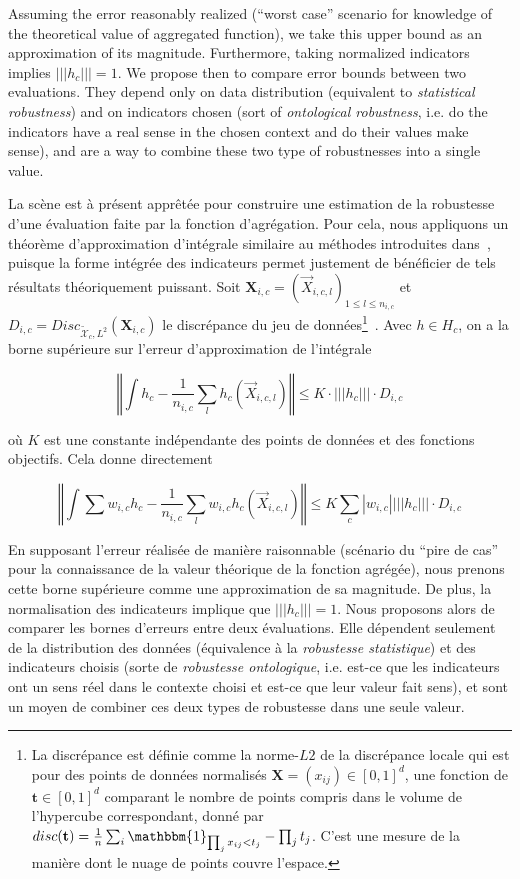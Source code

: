 {Assuming the error reasonably realized (``worst case'' scenario for knowledge of the theoretical value of aggregated function), we take this upper bound as an approximation of its magnitude. Furthermore, taking normalized indicators implies $\left|\left|\left|h_c\right|\right|\right| = 1$. We propose then to compare error bounds between two evaluations. They depend only on data distribution (equivalent to \emph{statistical robustness}) and on indicators chosen (sort of \emph{ontological robustness}, i.e. do the indicators have a real sense in the chosen context and do their values make sense), and are a way to combine these two type of robustnesses into a single value.
}{
La scène est à présent apprêtée pour construire une estimation de la robustesse d'une évaluation faite par la fonction d'agrégation. Pour cela, nous appliquons un théorème d'approximation d'intégrale similaire au méthodes introduites dans~\cite{varet2010developpement}, puisque la forme intégrée des indicateurs permet justement de bénéficier de tels résultats théoriquement puissant. Soit $\mathbf{X}_{i,c}=(\vec{X}_{i,c,l})_{1\leq l\leq n_{i,c}}$ et $D_{i,c}=Disc_{\tilde{\mathcal{X}}_{c},L^2}(\mathbf{X}_{i,c})$ le discrépance du jeu de données\footnote{La discrépance est définie comme la norme-$L2$ de la discrépance locale qui est pour des points de données normalisés $\mathbf{X}=(x_{ij})\in \left[0,1\right]^d$, une fonction de $\mathbf{t}\in \left[0,1\right]^d$ comparant le nombre de points compris dans le volume de l'hypercube correspondant, donné par $disc(\mathbf{t}) = \frac{1}{n}\sum_i \mathbbm{1}_{\prod_j x_{ij}<t_j} - \prod_j t_j$. C'est une mesure de la manière dont le nuage de points couvre l'espace.}~\cite{niederreiter1972discrepancy}. Avec $h\in H_{c}$, on a la borne supérieure sur l'erreur d'approximation de l'intégrale

\[
\left\Vert \int h_{c}-\frac{1}{n_{i,c}}\sum_{l}h_{c}(\vec{X}_{i,c,l})\right\Vert \leq K\cdot\left|\left|\left|h_{c}\right|\right|\right|\cdot D_{i,c}
\]

où $K$ est une constante indépendante des points de données et des fonctions objectifs. Cela donne directement

\[
\left\Vert \int\sum w_{i,c}h_{c}-\frac{1}{n_{i,c}}\sum_{l}w_{i,c}h_{c}(\vec{X}_{i,c,l})\right\Vert \leq K\sum_{c}\left|w_{i,c}\right|\left|\left|\left|h_{c}\right|\right|\right|\cdot D_{i,c}
\]


En supposant l'erreur réalisée de manière raisonnable (scénario du ``pire de cas'' pour la connaissance de la valeur théorique de la fonction agrégée), nous prenons cette borne supérieure comme une approximation de sa magnitude. De plus, la normalisation des indicateurs implique que $\left|\left|\left|h_c\right|\right|\right| = 1$. Nous proposons alors de comparer les bornes d'erreurs entre deux évaluations. Elle dépendent seulement de la distribution des données (équivalence à la \emph{robustesse statistique}) et des indicateurs choisis (sorte de \emph{robustesse ontologique}, i.e. est-ce que les indicateurs ont un sens réel dans le contexte choisi et est-ce que leur valeur fait sens), et sont un moyen de combiner ces deux types de robustesse dans une seule valeur.

}


